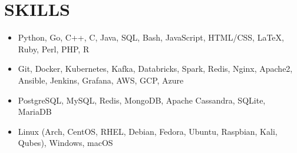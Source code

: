 \documentclass[11pt,letterpaper]{article}
\begin{document}







  \section*{SKILLS}

  \begin{itemize}
    \item{
      {}
      Python, Go, C++, C, Java, SQL, Bash, JavaScript, HTML/CSS, \LaTeX, Ruby, Perl, PHP, R
    }


    \item{
      {}
      Git, Docker, Kubernetes, Kafka, Databricks, Spark, Redis, Nginx, Apache2, Ansible, Jenkins, Grafana, AWS, GCP, Azure
    }

    \item{
      {}
      PostgreSQL, MySQL, Redis, MongoDB, Apache Cassandra, SQLite, MariaDB
    }


    \item{
      {}
      Linux (Arch, CentOS, RHEL, Debian, Fedora, Ubuntu, Raspbian, Kali, Qubes), Windows, macOS
    }
  \end{itemize}
\end{document}
